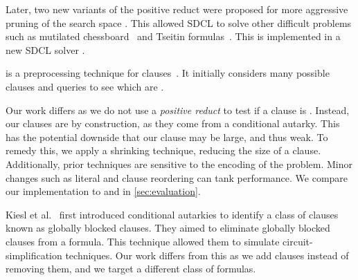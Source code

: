 Later, two new variants of the positive reduct were proposed for more aggressive
pruning of the search space \cite{sadical}. This allowed SDCL to solve other
difficult problems such as mutilated chessboard~\cite{mutilatedchessboard-pr} and
 Tseitin formulas~\cite{hardexamplesresolution}. This
is implemented in a new SDCL solver \sadical.


\prelearn is a preprocessing technique for \pr clauses~\cite{prelearn}. It
initially considers many possible clauses and queries \sadical to see which are
\pr.

Our work differs as we do not use a \emph{positive reduct} to test if a clause
is \pr. Instead, our clauses are \pr by construction, as they come from a
conditional autarky. This has the potential downside that our clause may be
large, and thus weak. To remedy this, we apply a shrinking technique, reducing
the size of a clause. Additionally, prior techniques are sensitive to the
encoding of the problem. Minor changes such as literal and clause reordering can
tank performance. We compare our
implementation \tool to \sadical and \prelearn in \autoref{sec:evaluation}.

Kiesl et al.~\cite{conditionalautarkies} first introduced conditional autarkies
to identify a class of \pr clauses known as globally blocked clauses. They aimed to eliminate globally blocked
clauses from a formula. This technique allowed them to simulate
circuit-simplification techniques. Our work differs from this as we add clauses
instead of removing them, and we target a different class of formulas.
